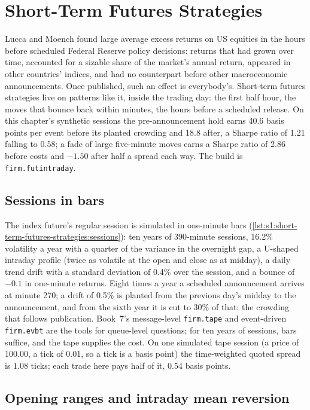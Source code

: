 \chapter{Short-Term Futures Strategies}\label{ch:s1:short-term-futures-strategies}

Lucca and Moench found large average excess returns on US equities in the hours before scheduled Federal Reserve policy decisions: returns that had
grown over time, accounted for a sizable share of the market's annual return, appeared in other countries' indices, and had no counterpart before other
macroeconomic announcements. Once published, such an effect is everybody's. Short-term futures strategies live on patterns like it, inside the
trading day: the first half hour, the moves that bounce back within minutes, the hours before a scheduled release. On this chapter's synthetic
sessions the pre-announcement hold earns 40.6 basis points per event before its planted crowding and 18.8 after, a Sharpe ratio of 1.21 falling to
0.58; a fade of large five-minute moves earns a Sharpe ratio of 2.86 before costs and $-1.50$ after half a spread each way. The build is
\texttt{firm.futintraday}.

\section{Sessions in bars}

The index future's regular session is simulated in one-minute bars (\cref{lst:s1:short-term-futures-strategies:sessions}): ten years of 390-minute
sessions, 16.2\% volatility a year with a quarter of the variance in the overnight gap, a U-shaped intraday profile (twice as volatile at the open and
close as at midday), a daily trend drift with a standard deviation of 0.4\% over the session, and a bounce of $-0.1$ in one-minute returns. Eight times a
year a scheduled announcement arrives at minute 270; a drift of 0.5\% is planted from the previous day's midday to the announcement, and from the sixth
year it is cut to 30\% of that: the crowding that follows publication. Book~7's message-level \texttt{firm.tape} and event-driven \texttt{firm.evbt} are
the tools for queue-level questions; for ten years of sessions, bars suffice, and the tape supplies the cost. On one simulated tape session (a price of
100.00, a tick of 0.01, so a tick is a basis point) the time-weighted quoted spread is 1.08 ticks; each trade here pays half of it, 0.54 basis points.

\section{Opening ranges and intraday mean reversion}

